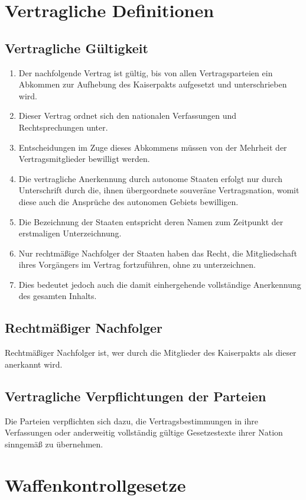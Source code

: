\documentclass{article}
\begin{document}
\section{Vertragliche Definitionen}

\subsection{Vertragliche Gültigkeit}
\begin{enumerate}[(1)]
    \item Der nachfolgende Vertrag ist gültig, bis von allen Vertragsparteien ein Abkommen zur Aufhebung des Kaiserpakts aufgesetzt und unterschrieben wird.
    \item Dieser Vertrag ordnet sich den nationalen Verfassungen und Rechtsprechungen unter.
    \item Entscheidungen im Zuge dieses Abkommens müssen von der Mehrheit der Vertragsmitglieder bewilligt werden.
    \item Die vertragliche Anerkennung durch autonome Staaten erfolgt nur durch Unterschrift durch die, ihnen übergeordnete souveräne Vertragsnation, womit diese auch die Ansprüche des autonomen Gebiets bewilligen.
    \item Die Bezeichnung der Staaten entspricht deren Namen zum Zeitpunkt der erstmaligen Unterzeichnung.
    \item Nur rechtmäßige Nachfolger der Staaten haben das Recht, die Mitgliedschaft ihres Vorgängers im Vertrag fortzuführen, ohne zu unterzeichnen.
    \item Dies bedeutet jedoch auch die damit einhergehende vollständige Anerkennung des gesamten Inhalts.
\end{enumerate}

\subsection{Rechtmäßiger Nachfolger}
Rechtmäßiger Nachfolger ist, wer durch die Mitglieder des Kaiserpakts als dieser anerkannt wird.

\subsection{Vertragliche Verpflichtungen der Parteien}
Die Parteien verpflichten sich dazu, die Vertragsbestimmungen in ihre Verfassungen oder anderweitig vollständig gültige Gesetzestexte ihrer Nation sinngemäß zu übernehmen.

\section{Waffenkontrollgesetze}
\end{document}
